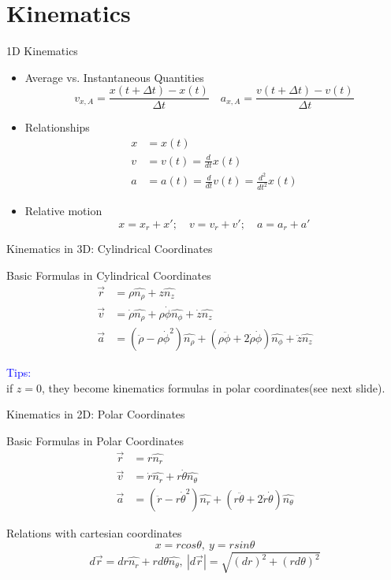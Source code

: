 \documentclass{beamer}
\begin{document}
\section{Kinematics}
\begin{frame}{1D Kinematics}
  \begin{itemize}
    \item Average vs. Instantaneous Quantities$$v_{x,A} = \frac{x(t+\Delta t)-x(t)}{\Delta t}\quad a_{x,A} = \frac{v(t+\Delta t)-v(t)}{\Delta t}$$
    \item Relationships\begin{align*}
    x &= x(t)\\
    v &= v(t)=\frac{d}{dt} x(t)\\
    a &= a(t)=\frac{d}{dt} v(t)=\frac{d^2}{dt^2}x(t)  
    \end{align*}
    \item Relative motion$$x = x_r + x';\quad v = v_r+v';\quad a=a_r+a'$$
  \end{itemize}
\end{frame}

\begin{frame}{Kinematics in 3D: Cylindrical Coordinates}
  \begin{block}{Basic Formulas in Cylindrical Coordinates}
    \begin{align*}\vec{r}&=\rho\hat{n_\rho}+z\hat{n_z}\\
  \vec{v}&=\dot{\rho}\hat{n_\rho}+\rho\dot{\phi}\hat{n_\phi}+\dot{z}\hat{n_z}\\
  \vec{a}&=(\ddot{\rho}-\rho\dot{\phi}^2)\hat{n_\rho}+(\rho\ddot{\phi}+2\dot{\rho}\dot{\phi})\hat{n_\phi}+\ddot{z}\hat{n_z}
  \end{align*}
\end{block}
  \textcolor{blue}{Tips:}\\
  if $z=0$, they become kinematics formulas in polar coordinates(see next slide).
\end{frame}

\begin{frame}{Kinematics in 2D: Polar Coordinates}
  \begin{block}{Basic Formulas in Polar Coordinates}
    \begin{align}\vec{r}&=r\hat{n_r}\\
      \vec{v}&=\dot{r}\hat{n_r}+r\dot{\theta}\hat{n_\theta}\\
      \vec{a}&=(\ddot{r}-r\dot{\theta}^2)\hat{n_r}+(r\ddot{\theta}+2\dot{r}\dot{\theta})\hat{n_\theta}
      \end{align}
  \end{block}\pause
  \begin{block}{Relations with cartesian coordinates}
    $$x=rcos\theta,\ y=rsin\theta$$
    $$d\vec{r}=dr\hat{n_r}+rd\theta\hat{n_\theta},\ |d\vec{r}|=\sqrt{(dr)^2+(rd\theta)^2}$$
  \end{block}
\end{frame}
\end{document}

